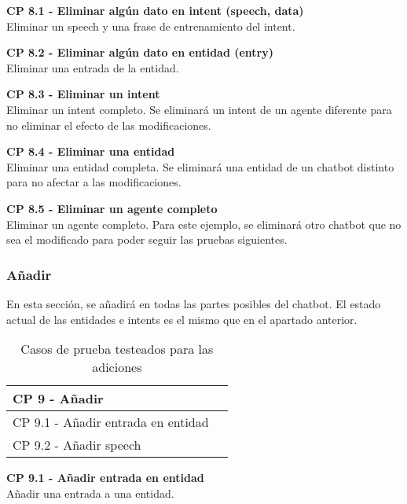 \textbf{CP 8.1 - Eliminar algún dato en intent (speech, data)}  \\
Eliminar un speech y una frase de entrenamiento del intent.

\textbf{CP 8.2 - Eliminar algún dato en entidad (entry)} \\
Eliminar una entrada de la entidad.

\textbf{CP 8.3 - Eliminar un intent} \\
Eliminar un intent completo. Se eliminará un intent de un agente diferente para no eliminar el efecto de las modificaciones.

\textbf{CP 8.4 - Eliminar una entidad} \\
Eliminar una entidad completa. Se eliminará una entidad de un chatbot distinto para no afectar a las modificaciones.

\textbf{CP 8.5 - Eliminar un agente completo} \\
Eliminar un agente completo. Para este ejemplo, se eliminará otro chatbot que no sea el modificado para poder seguir las pruebas siguientes.


\subsubsection{Añadir}
En esta sección, se añadirá en todas las partes posibles del chatbot. El estado actual de las entidades e intents es el mismo que en el apartado anterior.

\begin{table}[H]
\centering
\begin{tabular}{ll}
\toprule
CP 9 - Añadir   \\
\midrule
CP 9.1 - Añadir entrada en entidad  \\
CP 9.2 - Añadir speech \\
\bottomrule
\end{tabular}
\caption{Casos de prueba testeados para las adiciones}
\end{table}

\textbf{CP 9.1 - Añadir entrada en entidad} \\
Añadir una entrada a una entidad.

